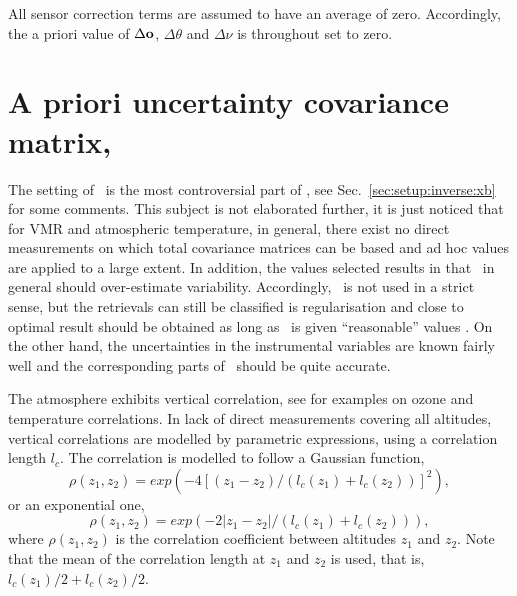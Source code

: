 All sensor correction terms are assumed to have an average of zero. Accordingly, the
a priori value of $\Delta\mathbf{o}$, $\Delta\theta$ and $\Delta\nu$ is
throughout set to zero.


\section{A priori uncertainty covariance matrix, }
\label{sec:Sa}
%
The setting of \ is the most controversial part of \OEM, see
Sec.~\ref{sec:setup:inverse:xb} for some comments. This subject is not
elaborated further, it is just noticed that for VMR and atmospheric
temperature, in general, there exist no direct measurements on which total
covariance matrices can be based and ad hoc values are applied to a large
extent. In addition, the values selected results in that \ in
general should over-estimate variability. Accordingly, \OEM\ is not used in a
strict sense, but the retrievals can still be classified is regularisation
\citep{ungermann2011tomographic} and close to optimal result should be obtained
as long as \ is given ``reasonable'' values
\citep{eriksson:analy:00}. On the other hand, the uncertainties in the
instrumental variables are known fairly well and the corresponding parts of
\ should be quite accurate.
\\
 

The atmosphere exhibits vertical correlation, see \citet{eriksson:stati:02} for
examples on ozone and temperature correlations. In lack of direct measurements
covering all altitudes, vertical correlations are modelled by parametric
expressions, using a correlation length $l_c$. The correlation is modelled to
follow a Gaussian function,
\begin{equation}
  \label{eq:corr:gau}
  \rho(z_1,z_2) = exp\left(-4[(z_1-z_2)/(l_c(z_1)+l_c(z_2))]^2\right),
\end{equation}
or an exponential one,
\begin{equation}
  \label{eq:corr:exp}
  \rho(z_1,z_2) = exp\left(-2\left|z_1-z_2\right|/(l_c(z_1)+l_c(z_2))\right),
\end{equation}
where $\rho(z_1,z_2)$ is the correlation coefficient between altitudes $z_1$
and $z_2$. Note that the mean of the correlation length at $z_1$ and $z_2$ is
used, that is,  $l_c(z_1)/2+l_c(z_2)/2$.

